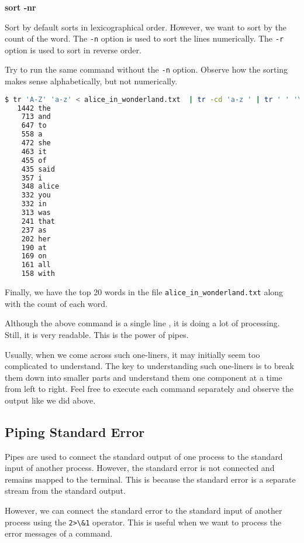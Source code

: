 \textbf{sort -nr}

Sort by default sorts in lexicographical order. However, we want to
sort by the count of the word. The \lstinline|-n| option is used to sort
the lines numerically. The \lstinline|-r| option is used to sort in
reverse order.

\begin{exercise}
  Try to run the same command without the \lstinline|-n| option.
  Observe how the sorting makes sense alphabetically, but not
  numerically.
\end{exercise}

\begin{lstlisting}[language=bash]
$ tr 'A-Z' 'a-z' < alice_in_wonderland.txt  | tr -cd 'a-z ' | tr ' ' '\n' | grep . | sort | uniq -c | sort -nr | head -20
   1442 the
    713 and
    647 to
    558 a
    472 she
    463 it
    455 of
    435 said
    357 i
    348 alice
    332 you
    332 in
    313 was
    241 that
    237 as
    202 her
    190 at
    169 on
    161 all
    158 with
\end{lstlisting}

Finally, we have the top 20 words in the file \lstinline|alice_in_wonderland.txt|
along with the count of each word.

Although the above command is a single line
, it is doing a lot of
processing. Still, it is very readable. This is the power of pipes.

\begin{remark}
  Usually, when we come across such one-liners, it may initially
  seem too complicated to understand. The key to understanding such
  one-liners is to break them down into smaller parts and understand
  them one component at a time from left to right. Feel free to
  execute each command separately and observe the output like we
  did above.
\end{remark}

\subsection{Piping Standard Error}

Pipes are used to connect the standard output of one process to the
standard input of another process. However, the standard error is not
connected and remains mapped to the terminal. This is because the
standard error is a separate stream from the standard output.

However, we can connect the standard error to the standard input of
another process using the \lstinline|2>\&1| operator. This is useful when
we want to process the error messages of a command.

